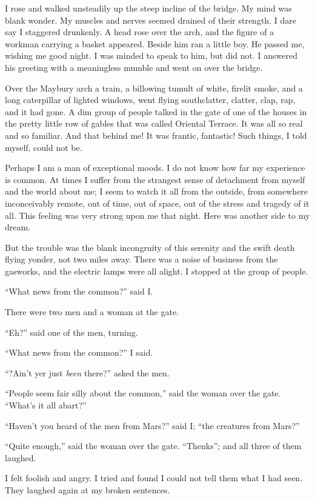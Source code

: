 I rose and walked unsteadily up the steep incline of the bridge. My
mind was blank wonder. My muscles and nerves seemed drained of
their strength. I dare say I staggered drunkenly. A head rose over
the arch, and the figure of a workman carrying a basket appeared.
Beside him ran a little boy. He passed me, wishing me good night. I
was minded to speak to him, but did not. I answered his greeting
with a meaningless mumble and went on over the bridge.

Over the Maybury arch a train, a billowing tumult of white, firelit
smoke, and a long caterpillar of lighted windows, went flying
south\dash{}clatter, clatter, clap, rap, and it had gone. A dim group of
people talked in the gate of one of the houses in the pretty little
row of gables that was called Oriental Terrace. It was all so real
and so familiar. And that behind me! It was frantic, fantastic!
Such things, I told myself, could not be.

Perhaps I am a man of exceptional moods. I do not know how far my
experience is common. At times I suffer from the strangest sense of
detachment from myself and the world about me; I seem to watch it
all from the outside, from somewhere inconceivably remote, out of
time, out of space, out of the stress and tragedy of it all. This
feeling was very strong upon me that night. Here was another side
to my dream.

But the trouble was the blank incongruity of this serenity and the
swift death flying yonder, not two miles away. There was a noise of
business from the gasworks, and the electric lamps were all alight.
I stopped at the group of people.

``What news from the common?'' said I.

There were two men and a woman at the gate.

``Eh?'' said one of the men, turning.

``What news from the common?'' I said.

``?Ain't yer just \emph{been} there?'' asked the men.

``People seem fair silly about the common,'' said the woman over the
gate. ``What's it all abart?''

``Haven't you heard of the men from Mars?'' said I; ``the creatures
from Mars?''

``Quite enough,'' said the woman over the gate. ``Thenks''; and all
three of them laughed.

I felt foolish and angry. I tried and found I could not tell them
what I had seen. They laughed again at my broken sentences.

